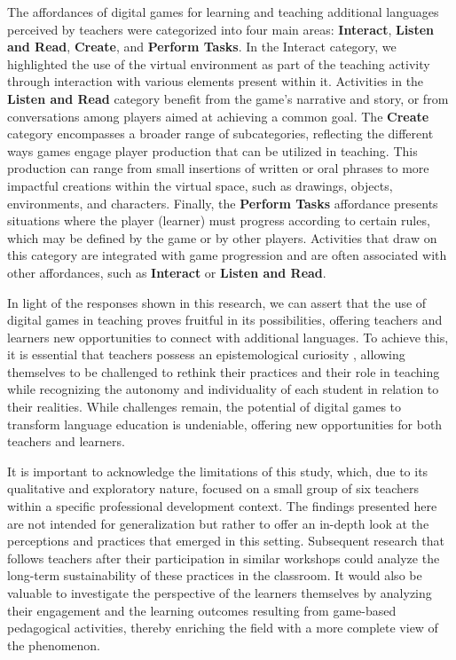 \documentclass[english]{textolivre}
\begin{document}
The affordances of digital games for learning and teaching additional languages perceived by teachers were categorized into four main areas: \textbf{Interact}, \textbf{Listen and Read}, \textbf{Create}, and \textbf{Perform Tasks}. In the Interact category, we highlighted the use of the virtual environment as part of the teaching activity through interaction with various elements present within it. Activities in the \textbf{Listen and Read} category benefit from the game’s narrative and story, or from conversations among players aimed at achieving a common goal. The \textbf{Create} category encompasses a broader range of subcategories, reflecting the different ways games engage player production that can be utilized in teaching. This production can range from small insertions of written or oral phrases to more impactful creations within the virtual space, such as drawings, objects, environments, and characters. Finally, the \textbf{Perform Tasks} affordance presents situations where the player (learner) must progress according to certain rules, which may be defined by the game or by other players. Activities that draw on this category are integrated with game progression and are often associated with other affordances, such as \textbf{Interact} or \textbf{Listen and Read}.

In light of the responses shown in this research, we can assert that the use of digital games in teaching proves fruitful in its possibilities, offering teachers and learners new opportunities to connect with additional languages. To achieve this, it is essential that teachers possess an epistemological curiosity \cite{freire2011autonomia}, allowing themselves to be challenged to rethink their practices and their role in teaching while recognizing the autonomy and individuality of each student in relation to their realities. While challenges remain, the potential of digital games to transform language education is undeniable, offering new opportunities for both teachers and learners.

It is important to acknowledge the limitations of this study, which, due to its qualitative and exploratory nature, focused on a small group of six teachers within a specific professional development context. The findings presented here are not intended for generalization but rather to offer an in-depth look at the perceptions and practices that emerged in this setting. Subsequent research that follows teachers after their participation in similar workshops could analyze the long-term sustainability of these practices in the classroom. It would also be valuable to investigate the perspective of the learners themselves by analyzing their engagement and the learning outcomes resulting from game-based pedagogical activities, thereby enriching the field with a more complete view of the phenomenon.
\end{document}
